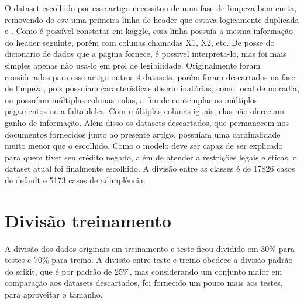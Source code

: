 \documentclass[12pt]{article}
\begin{document}
O dataset escolhido por esse artigo\cite{dataset} necessitou de uma fase de limpeza bem curta, removendo do csv uma primeira linha de header que estava logicamente duplicada e . Como é possível constatar em kaggle\cite{kaggle}, essa linha possuía a mesma informação do header seguinte, porém com colunas chamadas X1, X2, etc. De posse do dicionario de dados que a pagina fornece, é possivel interpreta-lo, mas foi mais simples apenas não usa-lo em prol de legibilidade. Originalmente foram considerados para esse artigo outros 4 datasets, porém foram descartados na fase de limpeza, pois possuíam características discriminatórias, como local de moradia, ou possuíam múltiplas colunas nulas, a fim de contemplar os múltiplos pagamentos ou a falta deles. Com múltiplas colunas iguais, elas não ofereciam ganho de informação. Além disso os datasets descartados, que permanecem nos documentos fornecidos junto ao presente artigo, possuíam uma cardinalidade muito menor que o escolhido. Como o modelo deve ser capaz de ser explicado para quem tiver seu crédito negado, além de atender a restrições legais e éticas, o dataset atual foi finalmente escolhido. A divisão entre as classes é de 17826 casos de default e 5173 casos de adimplência.

\section{Divisão treinamento}

A divisão dos dados originais em treinamento e teste ficou dividido em 30\% para testes e 70\% para treino. A divisão entre teste e treino obedece a divisão padrão do scikit, que é por padrão de 25\%, mas considerando um conjunto maior em comparação aos datasets descartados, foi fornecido um pouco mais aos testes, para aproveitar o tamanho.
\end{document}

